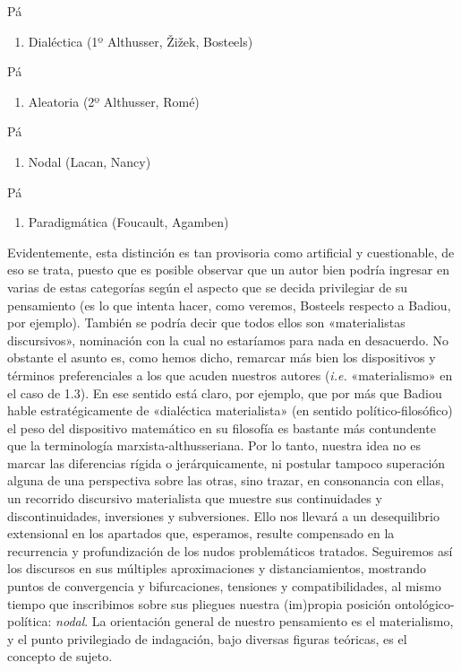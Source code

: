 Pá

\begin{enumerate}
\def\labelenumi{\arabic{enumi}.}
\item
  Dialéctica (1º Althusser, Žižek, Bosteels)
\end{enumerate}

Pá

\begin{enumerate}
\def\labelenumi{\arabic{enumi}.}
\item
  Aleatoria (2º Althusser, Romé)
\end{enumerate}

Pá

\begin{enumerate}
\def\labelenumi{\arabic{enumi}.}
\item
  Nodal (Lacan, Nancy)
\end{enumerate}

Pá

\begin{enumerate}
\def\labelenumi{\arabic{enumi}.}
\item
  Paradigmática (Foucault, Agamben)
\end{enumerate}

Evidentemente, esta distinción es tan provisoria como artificial y cuestionable, de eso se trata, puesto que es posible observar que un autor bien podría ingresar en varias de estas categorías según el aspecto que se decida privilegiar de su pensamiento (es lo que intenta hacer, como veremos, Bosteels respecto a Badiou, por ejemplo). También se podría decir que todos ellos son «materialistas discursivos», nominación con la cual no estaríamos para nada en desacuerdo. No obstante el asunto es, como hemos dicho, remarcar más bien los dispositivos y términos preferenciales a los que acuden nuestros autores (\emph{i.e.} «materialismo» en el caso de 1.3). En ese sentido está claro, por ejemplo, que por más que Badiou hable estratégicamente de «dialéctica materialista» (en sentido político-filosófico) el peso del dispositivo matemático en su filosofía es bastante más contundente que la terminología marxista-althusseriana. Por lo tanto, nuestra idea no es marcar las diferencias rígida o jerárquicamente, ni postular tampoco superación alguna de una perspectiva sobre las otras, sino trazar, en consonancia con ellas, un recorrido discursivo materialista que muestre sus continuidades y discontinuidades, inversiones y subversiones. Ello nos llevará a un desequilibrio extensional en los apartados que, esperamos, resulte compensado en la recurrencia y profundización de los nudos problemáticos tratados. Seguiremos así los discursos en sus múltiples aproximaciones y distanciamientos, mostrando puntos de convergencia y bifurcaciones, tensiones y compatibilidades, al mismo tiempo que inscribimos sobre sus pliegues nuestra (im)propia posición ontológico-política: \emph{nodal}. La orientación general de nuestro pensamiento es el materialismo, y el punto privilegiado de indagación, bajo diversas figuras teóricas, es el concepto de sujeto.


